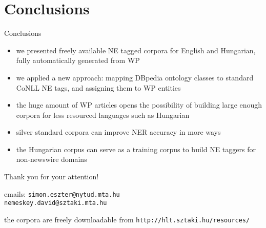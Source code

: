 \documentclass[utf8x,t]{beamer}
\newcommand{\vitem}{\vfill \item}
\begin{document}



\section{Conclusions}
\begin{frame}{Conclusions}
  \begin{itemize}
 \vitem we presented freely available NE tagged corpora for English and Hungarian, fully automatically generated from WP
  \vitem we applied a new approach: mapping DBpedia ontology classes to standard CoNLL NE tags, and assigning them to WP entities
  \vitem the huge amount of WP articles opens the possibility of building large enough corpora for less resourced languages such as Hungarian
  \vitem silver standard corpora can improve NER accuracy in more ways
  \vitem the Hungarian corpus can serve as a training corpus to build NE taggers for non-newswire domains
  \end{itemize}
  \vfill
\end{frame}

\begin{frame}

\bigskip

\bigskip

{\LARGE Thank you for your attention!}

\bigskip
\bigskip

emails: {\tt simon.eszter@nytud.mta.hu \\ nemeskey.david@sztaki.mta.hu} \\

\bigskip

the corpora are freely downloadable from {\tt http://hlt.sztaki.hu/resources/} 


\end{frame}
\end{document}
